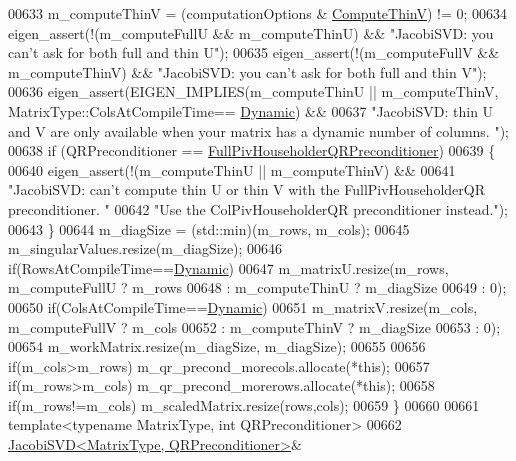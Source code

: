 \begin{DoxyCode}
00633   m\_computeThinV = (computationOptions & \hyperlink{group__enums_ggae3e239fb70022eb8747994cf5d68b4a9a1055e53fa95c8ae04a07ebb72cfafd95}{ComputeThinV}) != 0;
00634   eigen\_assert(!(m\_computeFullU && m\_computeThinU) && \textcolor{stringliteral}{"JacobiSVD: you can't ask for both full and thin U"});
00635   eigen\_assert(!(m\_computeFullV && m\_computeThinV) && \textcolor{stringliteral}{"JacobiSVD: you can't ask for both full and thin V"});
00636   eigen\_assert(EIGEN\_IMPLIES(m\_computeThinU || m\_computeThinV, MatrixType::ColsAtCompileTime==
      \hyperlink{namespace_eigen_ad81fa7195215a0ce30017dfac309f0b2}{Dynamic}) &&
00637               \textcolor{stringliteral}{"JacobiSVD: thin U and V are only available when your matrix has a dynamic number of columns.
      "});
00638   \textcolor{keywordflow}{if} (QRPreconditioner == \hyperlink{group__enums_gga46eba0d5c621f590b8cf1b53af31d56ea566c44ba828dea7f5d2fb174d799d5d2}{FullPivHouseholderQRPreconditioner})
00639   \{
00640       eigen\_assert(!(m\_computeThinU || m\_computeThinV) &&
00641               \textcolor{stringliteral}{"JacobiSVD: can't compute thin U or thin V with the FullPivHouseholderQR preconditioner. "}
00642               \textcolor{stringliteral}{"Use the ColPivHouseholderQR preconditioner instead."});
00643   \}
00644   m\_diagSize = (std::min)(m\_rows, m\_cols);
00645   m\_singularValues.resize(m\_diagSize);
00646   \textcolor{keywordflow}{if}(RowsAtCompileTime==\hyperlink{namespace_eigen_ad81fa7195215a0ce30017dfac309f0b2}{Dynamic})
00647     m\_matrixU.resize(m\_rows, m\_computeFullU ? m\_rows
00648                             : m\_computeThinU ? m\_diagSize
00649                             : 0);
00650   \textcolor{keywordflow}{if}(ColsAtCompileTime==\hyperlink{namespace_eigen_ad81fa7195215a0ce30017dfac309f0b2}{Dynamic})
00651     m\_matrixV.resize(m\_cols, m\_computeFullV ? m\_cols
00652                             : m\_computeThinV ? m\_diagSize
00653                             : 0);
00654   m\_workMatrix.resize(m\_diagSize, m\_diagSize);
00655   
00656   \textcolor{keywordflow}{if}(m\_cols>m\_rows)   m\_qr\_precond\_morecols.allocate(*\textcolor{keyword}{this});
00657   \textcolor{keywordflow}{if}(m\_rows>m\_cols)   m\_qr\_precond\_morerows.allocate(*\textcolor{keyword}{this});
00658   \textcolor{keywordflow}{if}(m\_rows!=m\_cols)  m\_scaledMatrix.resize(rows,cols);
00659 \}
00660 
00661 \textcolor{keyword}{template}<\textcolor{keyword}{typename} MatrixType, \textcolor{keywordtype}{int} QRPreconditioner>
00662 \hyperlink{group___s_v_d___module_class_eigen_1_1_jacobi_s_v_d}{JacobiSVD<MatrixType, QRPreconditioner>}&

\end{DoxyCode}
